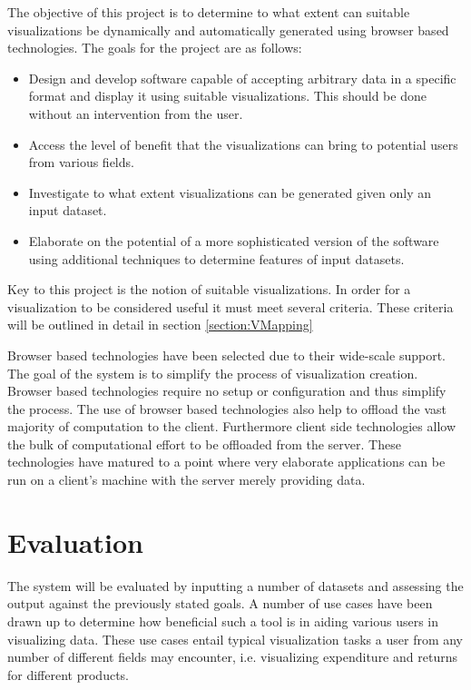 \documentclass[a4paper, 11pt, titlepage, onehalfspacing]{report}
\begin{document}
The objective of this project is to determine to what extent can suitable visualizations be dynamically and automatically generated using browser based technologies. The goals for the project are as follows:
\begin{itemize}
\item Design and develop software capable of accepting arbitrary data in a specific format and display it using suitable visualizations. This should be done without an intervention from the user.
\item Access the level of benefit that the visualizations can bring to potential users from various fields.
\item Investigate to what extent visualizations can be generated given only an input dataset.
\item Elaborate on the potential of a more sophisticated version of the software using additional techniques to determine features of input datasets.
\end{itemize}
Key to this project is the notion of suitable visualizations. In order for a visualization to be considered useful it must meet several criteria. These criteria will be outlined in detail in section \ref{section:VMapping} 

Browser based technologies have been selected due to their wide-scale support. The goal of the system is to simplify the process of visualization creation. Browser based technologies require no setup or configuration and thus simplify the process. The use of browser based technologies also help to offload the vast majority of computation to the client. Furthermore client side technologies allow the bulk of computational effort to be offloaded from the server. These technologies have matured to a point where very elaborate applications can be run on a client's machine with the server merely providing data.


	\section{Evaluation}

The system will be evaluated by inputting a number of datasets and assessing the output against the previously stated goals. A number of use cases have been drawn up to determine how beneficial such a tool is in aiding various users in visualizing data. These use cases entail typical visualization tasks a user from any number of different fields may encounter, i.e. visualizing expenditure and returns for different products.
\end{document}
